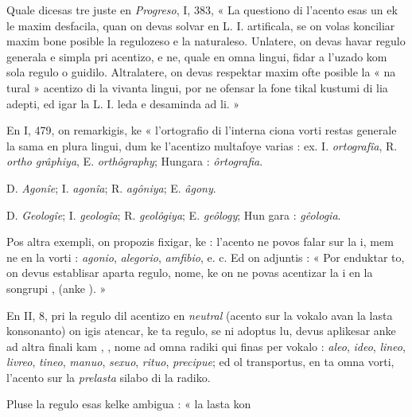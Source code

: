 \begin{VUpage}[183]{}
\VUsaut{1.50mm}
\VUsaut{4.54mm}

Quale dicesas tre juste en \textit{Progreso}, I, 383, « La questiono\nl
di l'acento esas un ek le maxim desfacila, quan on devas\nl
solvar en L. I. artificala, se on volas konciliar maxim bone\nl
posible la regulozeso e la naturaleso. Unlatere, on devas\nl
havar regulo generala e simpla pri acentizo, e ne, quale en\nl
omna lingui, fidar a l'uzado kom sola regulo o guidilo.\nl
Altralatere, on devas respektar maxim ofte posible la « na\cc
tural » acentizo di la vivanta lingui, por ne ofensar la fone\cc
tikal kustumi di lia adepti, ed igar la L. I. leda e desaminda\nl
ad li. »

En I, 479, on remarkigis, ke « l'ortografio di l'interna\cc
ciona vorti restas generale la sama en plura lingui, dum\nl
ke l'acentizo multafoye varias : ex. I. \textit{ortografîa}, R. \textit{ortho}\cc
\textit{grâphiya}, E. \textit{orthôgraphy}; Hungara : \textit{ôrtografia}.

D. \textit{Agonîe}; I. \textit{agonîa}; R. \textit{agôniya}; E. \textit{âgony}.

D. \textit{Geologîe}; I. \textit{geologîa}; R. \textit{geolôgiya}; E. \textit{geôlogy}; Hun\cc
gara : \textit{gêologia}.

Pos altra exempli, on propozis fixigar, ke : l'acento ne\nl
povos falar sur la i, mem ne en la vorti : \textit{agonio}, \textit{alegorio},\nl
\textit{amfibio}, e. c. Ed on adjuntis : « Por enduktar to, on devus\nl
establisar aparta regulo, nome, ke on ne povas acentizar la i\nl
en la songrupi ,  (anke ). »

En II, 8, pri la regulo dil acentizo en \textit{neutral} (acento sur\nl
la vokalo avan la lasta konsonanto) on igis atencar, ke ta\nl
regulo, se ni adoptus lu, devus aplikesar anke ad altra\nl
finali kam , , nome ad omna radiki qui finas per vokalo :\nl
\textit{aleo}, \textit{ideo}, \textit{lineo}, \textit{livreo}, \textit{tineo}, \textit{manuo}, \textit{sexuo}, \textit{rituo}, \textit{precipue};\nl
ed ol transportus, en ta omna vorti, l'acento sur la \textit{prelasta}\nl
silabo di la radiko.

Pluse la regulo esas kelke ambigua : « la lasta kon\cc
\end{VUpage}

